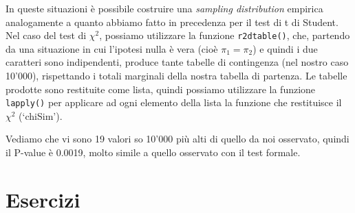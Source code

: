 \documentclass[
  12pt,
]{book}
\newenvironment{Shaded}{\begin{snugshade}}{\end{snugshade}}
\newcommand{\ControlFlowTok}[1]{\textcolor[rgb]{0.13,0.29,0.53}{\textbf{#1}}}
\newcommand{\DecValTok}[1]{\textcolor[rgb]{0.00,0.00,0.81}{#1}}
\newcommand{\DocumentationTok}[1]{\textcolor[rgb]{0.56,0.35,0.01}{\textbf{\textit{#1}}}}
\newcommand{\FloatTok}[1]{\textcolor[rgb]{0.00,0.00,0.81}{#1}}
\newcommand{\FunctionTok}[1]{\textcolor[rgb]{0.00,0.00,0.00}{#1}}
\newcommand{\NormalTok}[1]{#1}
\newcommand{\OtherTok}[1]{\textcolor[rgb]{0.56,0.35,0.01}{#1}}
\newcommand{\SpecialCharTok}[1]{\textcolor[rgb]{0.00,0.00,0.00}{#1}}
\begin{document}
In queste situazioni è possibile costruire una \emph{sampling distribution} empirica analogamente a quanto abbiamo fatto in precedenza per il test di t di Student. Nel caso del test di \(\chi^2\), possiamo utilizzare la funzione \texttt{r2dtable()}, che, partendo da una situazione in cui l'ipotesi nulla è vera (cioè \(\pi_1 = \pi_2\)) e quindi i due caratteri sono indipendenti, produce tante tabelle di contingenza (nel nostro caso 10'000), rispettando i totali marginali della nostra tabella di partenza. Le tabelle prodotte sono restituite come lista, quindi possiamo utilizzare la funzione \texttt{lapply()} per applicare ad ogni elemento della lista la funzione che restituisce il \(\chi^2\) (`chiSim').

\begin{Shaded}
\end{Shaded}

Vediamo che vi sono 19 valori so 10'000 più alti di quello da noi osservato, quindi il P-value è 0.0019, molto simile a quello osservato con il test formale.

\hypertarget{esercizi-7}{%
\section{Esercizi}\label{esercizi-7}}
\end{document}
